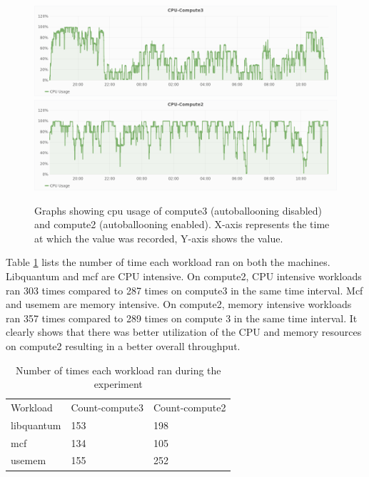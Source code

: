 \begin{figure}
  \centering
  \includegraphics[width=\textwidth]{cpu-compute3.png}
  \includegraphics[width=\textwidth]{cpu-compute2.png}
  \caption{Graphs showing cpu usage of compute3 (autoballooning disabled) and compute2 (autoballooning enabled). X-axis represents the time at which the value was recorded, Y-axis shows the value.}\label{fig:cpu}
\end{figure}
Table \ref{tab:count} lists the number of time each workload ran on both the machines. Libquantum and mcf are CPU intensive. On compute2, CPU intensive workloads ran 303 times compared to 287 times on compute3 in the same time interval. Mcf and usemem are memory intensive. On compute2, memory intensive workloads ran 357 times compared to 289 times on compute 3 in the same time interval. It clearly shows that there was better utilization of the CPU and memory resources on compute2 resulting in a better overall throughput. 

\begin{table}[hbt]
\caption{Number of times each workload ran during the experiment}
\label{tab:count}
\begin{center}
\begin{tabularx}{0.91\textwidth}{XXX}
\hline\noalign{\smallskip}
Workload & Count-compute3 & Count-compute2\\
\noalign{\smallskip}
\hline
\noalign{\smallskip}
libquantum & 153 & 198\\

mcf & 134 & 105 \\

usemem & 155 & 252 \\
\hline
\end{tabularx}
\end{center}
\end{table}


